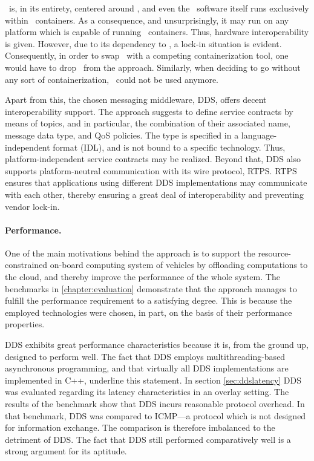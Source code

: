 \weave\ is, in its entirety, centered around \docker , and even the \weave\ software itself runs exclusively within \docker\ containers. As a consequence, and unsurprisingly, it may run on any platform which is capable of running \docker\ containers. Thus, hardware interoperability is given. However, due to its dependency to \docker , a lock-in situation is evident. Consequently, in order to swap \docker\ with a competing containerization tool, one would have to drop \wnet\ from the approach. Similarly, when deciding to go without any sort of containerization, \weave\ could not be used anymore.

Apart from this, the chosen messaging middleware, DDS, offers decent interoperability support. The approach suggests to define service contracts by means of topics, and in particular, the combination of their associated name, message data type, and QoS policies. The type is specified in a language-independent format (IDL), and is not bound to a specific technology. Thus, platform-independent service contracts may be realized. Beyond that, DDS also supports platform-neutral communication with its wire protocol, RTPS. RTPS ensures that applications using different DDS implementations may communicate with each other, thereby ensuring a great deal of interoperability and preventing vendor lock-in.

\paragraph{Performance.}
One of the main motivations behind the approach is to support the resource-constrained on-board computing system of vehicles by offloading computations to the cloud, and thereby improve the performance of the whole system. The benchmarks in \autoref{chapter:evaluation} demonstrate that the approach manages to fulfill the performance requirement to a satisfying degree. This is because the employed technologies were chosen, in part, on the basis of their performance properties.

DDS exhibits great performance characteristics because it is, from the ground up, designed to perform well. The fact that DDS employs multithreading-based asynchronous programming, and that virtually all DDS implementations are implemented in C++, underline this statement. In section \ref{sec:ddslatency} DDS was evaluated regarding its latency characteristics in an overlay setting. The results of the benchmark show that DDS incurs reasonable protocol overhead. In that benchmark, DDS was compared to ICMP---a protocol which is not designed for information exchange. The comparison is therefore imbalanced to the detriment of DDS. The fact that DDS still performed comparatively well is a strong argument for its aptitude. 

